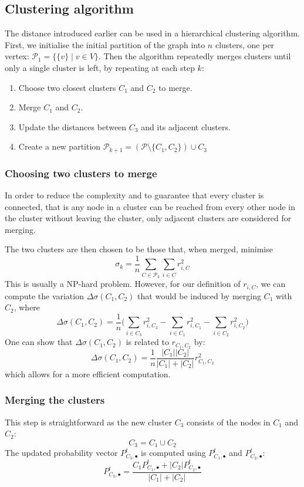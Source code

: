 \documentclass[12pt]{article}
\theoremstyle{definition}
\begin{document}
\subsection{Clustering algorithm}
The distance introduced earlier can be used in a hierarchical clustering algorithm. First, we initialise the initial partition of the graph into $n$ clusters, one per vertex: $\mathcal{P}_1 = \{\{v\} \mid v \in V\}$. Then the algorithm repeatedly merges clusters until only a single cluster is left, by repeating at each step $k$:
\begin{enumerate}
	\item Choose two closest clusters $C_1$ and $C_2$ to merge.
	\item Merge $C_1$ and $C_2$.
	\item Update the distances between $C_3$ and its adjacent clusters.
	\item Create a new partition $\mathcal{P}_{k+1} = (\mathcal{P} \setminus \{C_1, C_2\}) \cup C_3$
\end{enumerate}
\subsubsection{Choosing two clusters to merge}
In order to reduce the complexity and to guarantee that every cluster is connected, that is any node in a cluster can be reached from every other node in the cluster without leaving the cluster, only adjacent clusters are considered for merging.

The two clusters are then chosen to be those that, when merged, minimise 
\[\sigma_k = \frac{1}{n} \sum_{C \in \mathcal{P}_k} \sum_{i \in C} r_{i,C}^2\]
This is usually a NP-hard problem. However, for our definition of $r_{i,C}$, we can compute the variation $\Delta\sigma(C_1,C_2)$ that would be induced by merging $C_1$ with $C_2$, where
\[\Delta\sigma(C_1,C_2) = \frac{1}{n} \big( \sum_{i \in C_3} r_{i,C_3}^2 - \sum_{i \in C_1} r_{i,C_1}^2 - \sum_{i \in C_2} r_{i,C_2}^2 \big)\]
One can show that $\Delta\sigma(C_1,C_2)$ is related to $r_{C_1, C_2}$ by:
\begin{equation}
	\label{eq_theorem3}
	\Delta\sigma(C_1,C_2) = \frac{1}{n}\frac{|C_1||C_2|}{|C_1| + |C_2|} r_{C_1,C_2}^2 
\end{equation}
which allows for a more efficient computation.
\subsubsection{Merging the clusters}
This step is straightforward as the new cluster $C_3$ consists of the nodes in $C_1$ and $C_2$:
\[ C_3 = C_1 \cup C_2 \]
The updated probability vector $P_{C_3,\bullet}^t$ is computed using $P_{C_1,\bullet}^t$ and $P_{C_2,\bullet}^t$:
\begin{equation}
\label{eq_update_P_t}
P_{C_3,\bullet}^t = \frac{C_1 P_{C_1,\bullet}^t + |C_2| P_{C_2,\bullet}^t}{|C_1| + |C_2|}
\end{equation}
\end{document}
